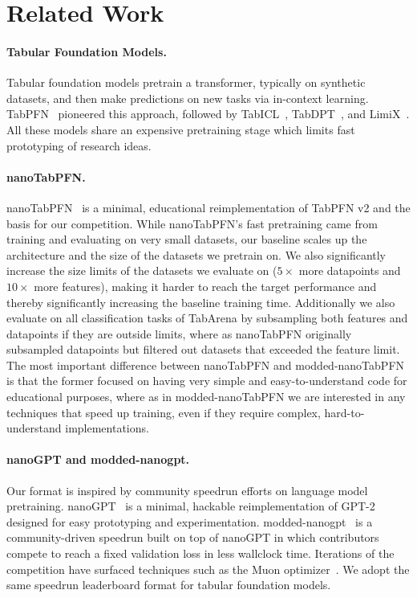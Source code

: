 \documentclass{article}
\theoremstyle{plain}
\theoremstyle{definition}
\theoremstyle{remark}
\begin{document}
\section{Related Work}

\paragraph{Tabular Foundation Models.}
Tabular foundation models pretrain a transformer, typically on synthetic datasets, and then make predictions on new tasks via in-context learning.
TabPFN~\citep{hollmann2023tabpfn,hollmann2025tabpfnv2,grinsztajn2026tabpfn25advancingstateart} pioneered this approach,
followed by TabICL~\citep{qu2025tabicl,qu2026tabiclv2}, TabDPT~\citep{ma2025tabdpt}, and LimiX~\citep{zhang2025limix}.
All these models share an expensive pretraining stage which limits fast prototyping of research ideas.

\paragraph{nanoTabPFN.}
nanoTabPFN~\citep{pfefferle2025nanotabpfn} is a minimal, educational reimplementation of TabPFN v2 and the basis for our competition.
While nanoTabPFN's fast pretraining came from training and evaluating on very small datasets, our baseline scales up the  architecture and the size of the datasets we pretrain on. We also significantly increase the size limits of the datasets we evaluate on ($5\times$ more datapoints and $10\times$ more features), making it harder to reach the target performance and thereby significantly increasing the baseline training time. Additionally we also evaluate on all classification tasks of TabArena by subsampling both features and datapoints if they are outside limits, where as nanoTabPFN originally subsampled datapoints but filtered out datasets that exceeded the feature limit. The most important difference between nanoTabPFN and modded-nanoTabPFN is that the former focused on having very simple and easy-to-understand code for educational purposes, where as in modded-nanoTabPFN we are interested in any techniques that speed up training, even if they require complex, hard-to-understand implementations.

\paragraph{nanoGPT and modded-nanogpt.}
Our format is inspired by community speedrun efforts on language model pretraining.
nanoGPT~\citep{karpathy2023nanogpt} is a minimal, hackable reimplementation of GPT-2 designed for easy prototyping and experimentation.
modded-nanogpt~\citep{moddednanogpt} is a community-driven speedrun built on top of nanoGPT in which contributors compete to reach a fixed validation loss in less wallclock time.
Iterations of the competition have surfaced techniques such as the Muon optimizer~\citep{jordan2024muon}.
We adopt the same speedrun leaderboard format for tabular foundation models.
\end{document}
